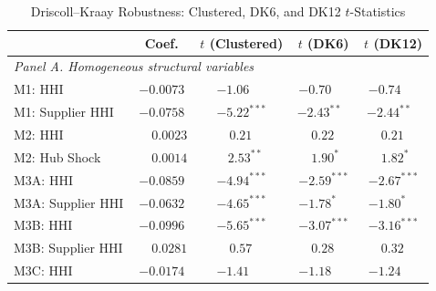 
\begin{table}[!htbp]
\centering
\small
\caption{Driscoll--Kraay Robustness: Clustered, DK6, and DK12 $t$-Statistics}
\label{tab:dk_robustness}

\begin{threeparttable}
\begin{tabular}{l c c c c}
\toprule
 & \multicolumn{1}{c}{Coef.}
 & \multicolumn{1}{c}{$t$ (Clustered)}
 & \multicolumn{1}{c}{$t$ (DK6)}
 & \multicolumn{1}{c}{$t$ (DK12)} \\
\midrule
\multicolumn{5}{l}{\textit{Panel A. Homogeneous structural variables}} \\
\addlinespace[2pt]
M1: HHI                       & $-0.0073$  & $-1.06\phantom{^{***}}$ & $-0.70\phantom{^{***}}$ & $-0.74\phantom{^{***}}$ \\
M1: Supplier HHI              & $-0.0758$  & $-5.22^{***}$           & $-2.43^{**\phantom{*}}$ & $-2.44^{**\phantom{*}}$ \\
M2: HHI                       & $\phantom{-}0.0023$ & $\phantom{-}0.21\phantom{^{***}}$ & $\phantom{-}0.22\phantom{^{***}}$ & $\phantom{-}0.21\phantom{^{***}}$ \\
M2: Hub Shock                 & $\phantom{-}0.0014$ & $\phantom{-}2.53^{**\phantom{*}}$ & $\phantom{-}1.90^{*\phantom{**}}$ & $\phantom{-}1.82^{*\phantom{**}}$ \\
M3A: HHI                      & $-0.0859$  & $-4.94^{***}$           & $-2.59^{***}$           & $-2.67^{***}$ \\
M3A: Supplier HHI             & $-0.0632$  & $-4.65^{***}$           & $-1.78^{*\phantom{**}}$ & $-1.80^{*\phantom{**}}$ \\
M3B: HHI                      & $-0.0996$  & $-5.65^{***}$           & $-3.07^{***}$           & $-3.16^{***}$ \\
M3B: Supplier HHI             & $\phantom{-}0.0281$ & $\phantom{-}0.57\phantom{^{***}}$ & $\phantom{-}0.28\phantom{^{***}}$ & $\phantom{-}0.32\phantom{^{***}}$ \\
M3C: HHI                      & $-0.0174$  & $-1.41\phantom{^{***}}$ & $-1.18\phantom{^{***}}$ & $-1.24\phantom{^{***}}$ \\

\end{tabular}
\end{threeparttable}
\end{table}
